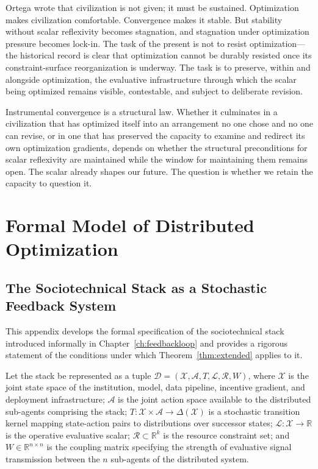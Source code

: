 \documentclass[12pt, oneside]{book}
\theoremstyle{plain}
\theoremstyle{definition}
\theoremstyle{remark}
\theoremstyle{definition}
\begin{document}
Ortega wrote that civilization is not given; it must be sustained. Optimization
makes civilization comfortable. Convergence makes it stable. But stability without
scalar reflexivity becomes stagnation, and stagnation under optimization pressure
becomes lock-in. The task of the present is not to resist optimization---the
historical record is clear that optimization cannot be durably resisted once its
constraint-surface reorganization is underway. The task is to preserve, within and
alongside optimization, the evaluative infrastructure through which the scalar being
optimized remains visible, contestable, and subject to deliberate revision.

Instrumental convergence is a structural law. Whether it culminates in a civilization
that has optimized itself into an arrangement no one chose and no one can revise, or
in one that has preserved the capacity to examine and redirect its own optimization
gradients, depends on whether the structural preconditions for scalar reflexivity
are maintained while the window for maintaining them remains open. The scalar already
shapes our future. The question is whether we retain the capacity to question it.

\appendix

\chapter{Formal Model of Distributed Optimization}
\label{app:formal}

\section{The Sociotechnical Stack as a Stochastic Feedback System}

This appendix develops the formal specification of the sociotechnical stack
introduced informally in Chapter~\ref{ch:feedbackloop} and provides a rigorous
statement of the conditions under which Theorem~\ref{thm:extended} applies to it.

Let the stack be represented as a tuple
$\mathcal{D} = (\mathcal{X}, \mathcal{A}, T, \mathcal{L}, \mathcal{R}, W)$,
where $\mathcal{X}$ is the joint state space of the institution, model, data
pipeline, incentive gradient, and deployment infrastructure; $\mathcal{A}$ is the
joint action space available to the distributed sub-agents comprising the stack;
$T: \mathcal{X} \times \mathcal{A} \to \Delta(\mathcal{X})$ is a stochastic
transition kernel mapping state-action pairs to distributions over successor states;
$\mathcal{L}: \mathcal{X} \to \mathbb{R}$ is the operative evaluative scalar;
$\mathcal{R} \subset \mathbb{R}^k$ is the resource constraint set; and
$W \in \mathbb{R}^{n \times n}$ is the coupling matrix specifying the strength of
evaluative signal transmission between the $n$ sub-agents of the distributed system.
\end{document}
